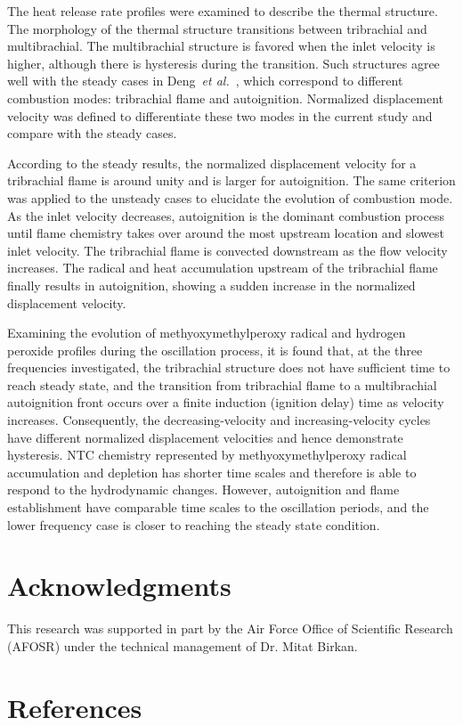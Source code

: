 \documentclass[review,3p,times]{elsarticle}
\begin{document}
The heat release rate profiles were examined to describe the thermal structure.  The morphology of the thermal structure transitions between tribrachial and multibrachial.  The multibrachial structure is favored when the inlet velocity is higher, although there is hysteresis during the transition.  Such structures agree well with the steady cases in Deng~\emph{et al.}~\cite{deng15b}, which correspond to different combustion modes: tribrachial flame and autoignition.  Normalized displacement velocity was defined to differentiate these two modes in the current study and compare with the steady cases.  

According to the steady results, the normalized displacement velocity for a tribrachial flame is around unity and is larger for autoignition.  The same criterion was applied to the unsteady cases to elucidate the evolution of combustion mode.  As the inlet velocity decreases, autoignition is the dominant combustion process until flame chemistry takes over around the most upstream location and slowest inlet velocity.  The tribrachial flame is convected downstream as the flow velocity increases.  The radical and heat accumulation upstream of the tribrachial flame finally results in autoignition, showing a sudden increase in the normalized displacement velocity.  

Examining the evolution of methyoxymethylperoxy radical and hydrogen peroxide profiles during the oscillation process, it is found that, at the three frequencies investigated, the tribrachial structure does not have sufficient time to reach steady state, \textcolor{CNF}{and the transition from tribrachial flame to a multibrachial autoignition front occurs over a finite induction (ignition delay) time as velocity increases}.  Consequently, the decreasing-velocity and increasing-velocity cycles have different normalized displacement velocities and hence demonstrate hysteresis.  NTC chemistry represented by methyoxymethylperoxy radical accumulation and depletion has shorter time scales and therefore is able to respond to the hydrodynamic changes.  However, autoignition and flame establishment have comparable time scales to the oscillation periods, and the lower frequency case is closer to reaching the steady state condition.

\section*{Acknowledgments}
This research was supported in part by the Air Force Office of Scientific Research (AFOSR) under the technical management of Dr. Mitat Birkan.


\section*{References}



\renewcommand{\thefigure}{\arabic{figure}}
\renewcommand{\thetable}{\arabic{table}}

\clearpage
\listoffigures
\end{document}
